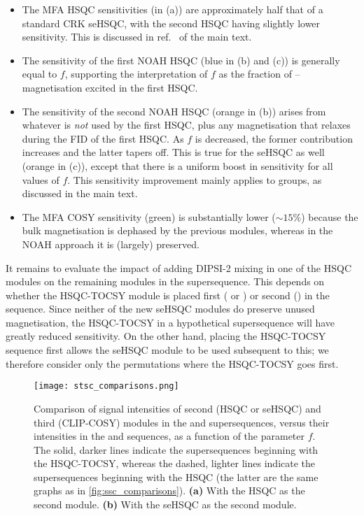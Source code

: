 \begin{itemize}
    \item The MFA HSQC sensitivities (in (a)) are approximately half that of a standard CRK seHSQC, with the second HSQC having slightly lower sensitivity.
        This is discussed in ref.\  of the main text.
    \item The sensitivity of the first NOAH HSQC (blue in (b) and (c)) is generally equal to $f$, supporting the interpretation of $f$ as the fraction of \carbon{}--\proton{} magnetisation excited in the first HSQC.
    \item The sensitivity of the second NOAH HSQC (orange in (b)) arises from whatever is \textit{not} used by the first HSQC, plus any magnetisation that relaxes during the FID of the first HSQC.
        As $f$ is decreased, the former contribution increases and the latter tapers off.
        This is true for the seHSQC as well (orange in (c)), except that there is a uniform boost in sensitivity for all values of $f$.
        This sensitivity improvement mainly applies to  groups, as discussed in the main text.
    \item The MFA COSY sensitivity (green) is substantially lower ($\sim 15\%$) because the bulk magnetisation is dephased by the previous modules, whereas in the NOAH approach it is (largely) preserved.
\end{itemize}

It remains to evaluate the impact of adding DIPSI-2 mixing in one of the HSQC modules on the remaining modules in the supersequence.
This depends on whether the HSQC-TOCSY module is placed first ( or ) or second () in the sequence.
Since neither of the new seHSQC modules do preserve unused  magnetisation, the HSQC-TOCSY in a hypothetical  supersequence will have greatly reduced sensitivity.
On the other hand, placing the HSQC-TOCSY sequence first allows the seHSQC module to be used subsequent to this; we therefore consider only the permutations where the HSQC-TOCSY goes first.

\begin{figure}
    \centering
    \texttt{[image: stsc\_comparisons.png]}
    \caption{
        Comparison of signal intensities of second (HSQC or seHSQC) and third (CLIP-COSY) modules in the  and  supersequences, versus their intensities in the  and  sequences, as a function of the parameter $f$.
        The solid, darker lines indicate the supersequences beginning with the HSQC-TOCSY, whereas the dashed, lighter lines indicate the supersequences beginning with the HSQC (the latter are the same graphs as in \cref{fig:ssc_comparisons}).
        \textbf{(a)} With the HSQC as the second module.
        \textbf{(b)} With the seHSQC as the second module.
        \andro{}
    }
    \label{fig:stsc_comparisons}
\end{figure}

